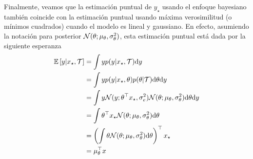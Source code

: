 Finalmente, veamos que la estimación puntual de $y_\star$ usando el enfoque bayesiano también coincide con la estimación puntual usando máxima verosimilitud (o mínimos cuadrados) cuando el modelo es lineal y gaussiano. En efecto, asumiendo la notación para posterior ${\mathcal N}(\theta;\mu_\theta, \sigma_\theta^2)$, esta estimación puntual está dada por la siguiente esperanza
\begin{align}
	\operatorname{\mathbb{E}}\left[y|x_\star,{\mathcal T}\right] 
	&= \int y p(y|x_\star,{\mathcal T}) {\text d} y \\
	&= \int y p(y|x_\star, \theta)p(\theta|{\mathcal T}) {\text d} \theta {\text d} y \nonumber\\
	&= \int y {\mathcal N}(y;\theta^\top x_\star ,\sigma_e^2){\mathcal N}(\theta;\mu_\theta, \sigma_\theta^2) {\text d}\theta {\text d} y \nonumber\\
	&= \int \theta^\top x_\star {\mathcal N}(\theta;\mu_\theta, \sigma_\theta^2) {\text d} \theta \nonumber\\
	&= \left(\int \theta {\mathcal N}(\theta;\mu_\theta, \sigma_\theta^2) {\text d} \theta\right)^\top x_\star \nonumber\\
	&= \mu_\theta^\top x \nonumber
\end{align}




